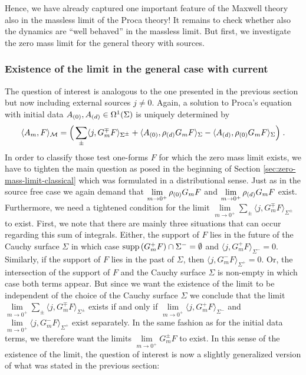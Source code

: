  Hence, we have already captured one important feature of the Maxwell theory also in the massless limit of the Proca theory! It remains to check whether also the dynamics are ``well behaved'' in the massless limit. But first, we investigate the zero mass limit for the general theory with sources.
%
%
%
%
\subsubsection{Existence of the limit in the general case with current}\label{sec:zero-mass-limit-existence-classical-general-source}
The question of interest is analogous to the one presented in the previous section but now including external sources $j \neq 0$. Again, a solution to Proca's equation with initial data ${A_{(0)}}, {A_{(d)}} \in \Omega^1(\Sigma)$ is uniquely determined  by
\begin{align}
	\langle A_m , F \rangle_{\mathcal{M}} = \Big( \sum\limits_\pm \langle j , G_m^\mp F   \rangle_{\Sigma^\pm} +\langle {A_{(0)}} , \rho_{(d)} G_m F \rangle_\Sigma
	- \langle {A_{(d)}} , \rho_{(0)} G_m F \rangle_\Sigma \Big) \;.
\end{align}
In order to classify those test one-forms $F$ for which the zero mass limit exists, we have to tighten the main question as posed in the beginning of Section \ref{sec:zero-mass-limit-classical} which was formulated in a distributional sense. Just as in the source free case we again demand that $\lim\limits_{m \to 0^+} \rho_{(0)} G_m F$ and  $\lim\limits_{m \to 0^+} \rho_{(d)} G_m F$ exist. Furthermore, we need a tightened  condition for the limit $\lim\limits_{m \to 0^+} \sum_\pm \langle j , G_m^\mp F   \rangle_{\Sigma^\pm} $ to exist. First, we note that there are mainly three situations that can occur regarding this sum of integrals. Either, the support of $F$ lies in the future of the Cauchy surface $\Sigma$ in which case $\text{\upshape{supp}}\left(G_m^+ F\right) \cap \Sigma^- = \emptyset$ and $\langle j , G_m^+ F   \rangle_{\Sigma^-} = 0$. Similarly, if the support of $F$ lies in the past of $\Sigma$, then $\langle j , G_m^- F   \rangle_{\Sigma^+} = 0$. Or, the intersection of the support of $F$ and the Cauchy surface $\Sigma$ is non-empty in which case both terms appear. But since we want the existence of the limit to be independent of the choice of the Cauchy surface $\Sigma$ we conclude that the limit $\lim\limits_{m \to 0^+} \sum_\pm \langle j , G_m^\mp F   \rangle_{\Sigma^\pm} $ exists if and only if $\lim\limits_{m \to 0^+} \langle j , G_m^+ F   \rangle_{\Sigma^-}$ and $\lim\limits_{m \to 0^+} \langle j , G_m^- F   \rangle_{\Sigma^+}$ exist separately. In the same fashion as for the initial data terms, we therefore want the limits $\lim\limits_{m \to 0^+} G_m^\pm F$ to exist. In this sense of the existence of the limit, the question of interest is now a slightly generalized version of what was stated in the previous section:
